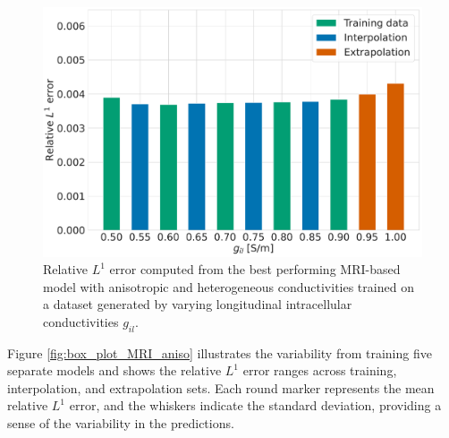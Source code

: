 \begin{figure}[H]
  \centering
  \includegraphics[width=0.8\linewidth]{Figs/Anisotropic/L1_error_bar_plot.pdf}
  \caption{Relative $L^1$ error computed from the best performing MRI-based model with anisotropic and heterogeneous conductivities trained on a dataset generated by varying longitudinal intracellular conductivities $g_{il}$.}
  \label{fig:RL1_anisotropic}
\end{figure}


Figure \ref{fig:box_plot_MRI_aniso} illustrates the variability from training five separate models and shows the relative $L^1$ error ranges across training, interpolation, and extrapolation sets. Each round marker represents the mean relative $L^1$ error, and the whiskers indicate the standard deviation, providing a sense of the variability in the predictions.

